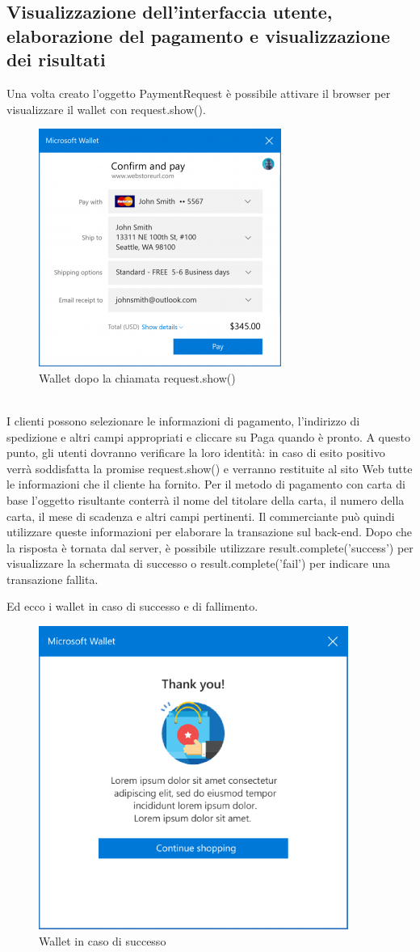 \documentclass[11pt ,a4paper , twoside , openright ]{article}
\begin{document}
	\subsection{Visualizzazione dell'interfaccia utente, elaborazione del pagamento e visualizzazione dei risultati}
	Una volta creato l'oggetto PaymentRequest è possibile attivare il browser per visualizzare il wallet con request.show(). 
	\begin{figure}[h]
		\centering
		\includegraphics[width=0.5\linewidth]{wallet1}
		\caption{Wallet dopo la chiamata request.show()}
		\label{fig: Wallet dopo la chiamata request.show()}
	\end{figure}
	\\
	I clienti possono  selezionare le informazioni di pagamento, l'indirizzo di spedizione e altri campi appropriati e cliccare su Paga quando è pronto. A questo punto, gli utenti dovranno verificare la loro identità: in caso di esito positivo verrà soddisfatta la promise request.show() e verranno restituite al sito Web tutte le informazioni che il cliente ha fornito. Per il metodo di pagamento con carta di base l'oggetto risultante conterrà il nome del titolare della carta, il numero della carta, il mese di scadenza e altri campi pertinenti. Il commerciante può quindi utilizzare queste informazioni per elaborare la transazione sul back-end.
	Dopo che la risposta è tornata dal server, è possibile utilizzare result.complete('success') per visualizzare la schermata di successo o result.complete('fail') per indicare una transazione fallita.
	
	\pagebreak
	Ed ecco i wallet in caso di successo e di fallimento.
	\begin{figure}[h]
		\centering
		\includegraphics[width=0.5\linewidth]{wallet2}
		\caption{Wallet in caso di successo}
		\label{fig: Wallet in caso di successo}
	\end{figure}
\end{document}
